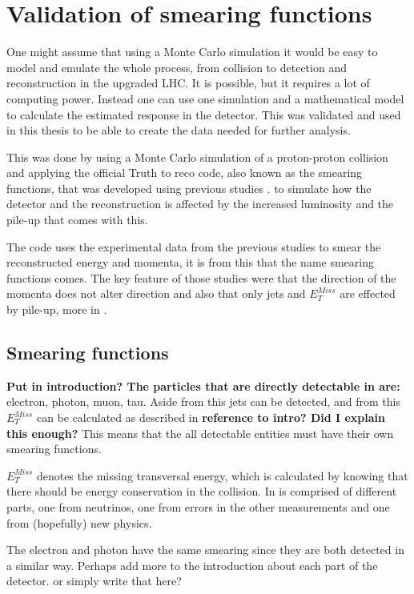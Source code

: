\chapter{Validation of smearing functions}\label{cha:vali}
One might assume that using a Monte Carlo simulation it would be easy to model and emulate the whole process, from collision to detection and reconstruction in the upgraded LHC. It is possible, but it requires a lot of computing power. Instead one can use one simulation and a mathematical model to calculate the estimated response in the detector. This was validated and used in this thesis to be able to create the data needed for further analysis. 

This was done by using a Monte Carlo simulation of a proton-proton collision and applying the official Truth to reco code, also known as the smearing functions, that was developed using previous studies \citep{ATLAS:LOI2, ATL-PHYS-PUB-2013-004}. to simulate how the detector and the reconstruction is affected by the increased luminosity and the pile-up that comes with this.

The code uses the experimental data from the previous studies to smear the reconstructed energy and momenta, it is from this that the name smearing functions comes.
The key feature of those studies were that the direction of the momenta does not alter direction and also that only jets and $E^{Miss}_T$ are effected by pile-up, more in .

\newpage
\section{Smearing functions}\label{sec:smear}
\textbf{Put in introduction? The particles that are directly detectable in \abbrATLAS are:} electron, photon, muon, tau. Aside from this jets can be detected, and from this $E_T^{Miss}$ can be calculated as described in \textbf{reference to intro? Did I explain this enough?} This means that the all detectable entities must have their own smearing functions. 

$E_T^{Miss}$ denotes the missing transversal energy, which is calculated by knowing that there should be energy conservation in the collision. In is comprised of different parts, one from neutrinos, one from errors in the other measurements and one from (hopefully) new physics.

The electron and photon have the same smearing since they are both detected in a similar way.  Perhaps add more to the introduction about each part of the detector. or simply write that here?

